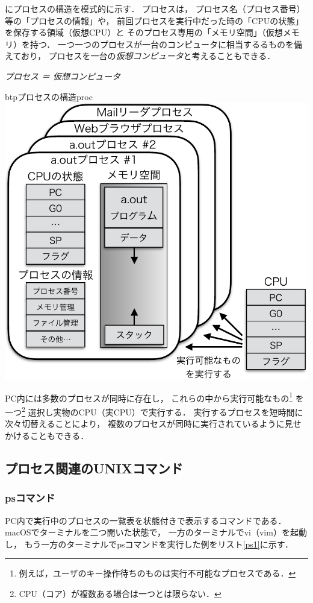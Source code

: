 にプロセスの構造を模式的に示す．
プロセスは，
プロセス名（プロセス番号）等の「プロセスの情報」や，
前回プロセスを実行中だった時の「CPUの状態」を保存する領域（仮想CPU）と
そのプロセス専用の「メモリ空間」（仮想メモリ）を持つ．
一つ一つのプロセスが一台のコンピュータに相当するるものを備えており，
プロセスを一台の\emph{仮想コンピュータ}と考えることもできる．

\begin{center}
\emph{\Large プロセス ＝ 仮想コンピュータ}
\end{center}


\begin{myfig}{btp}{プロセスの構造}{proc}
  \includegraphics[scale=0.7]{Fig/proc-crop.pdf}
\end{myfig}

PC内には多数のプロセスが同時に存在し，
これらの中から実行可能なもの\footnote{
例えば，ユーザのキー操作待ちのものは実行不可能なプロセスである．}
を一つ\footnote{CPU（コア）が複数ある場合は一つとは限らない．}
選択し実物のCPU（実CPU）で実行する．
実行するプロセスを短時間に次々切替えることにより，
複数のプロセスが同時に実行されているように見せかけることもできる．

\subsection{プロセス関連のUNIXコマンド}

\subsubsection{psコマンド}
PC内で実行中のプロセスの一覧表を状態付きで表示するコマンドである．
macOSでターミナルを二つ開いた状態で，
一方のターミナルでvi（vim）を起動し，
もう一方のターミナルでpsコマンドを実行した例をリスト\ref{ps1}に示す．

